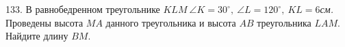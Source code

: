 133. В равнобедренном треугольнике $KLM\ \angle K=30^\circ,\ \angle L=120^\circ,\ KL=6${\it см.} Проведены высота $MA$ данного треугольника и высота $AB$ треугольника $LAM.$ Найдите длину $BM.$\\
